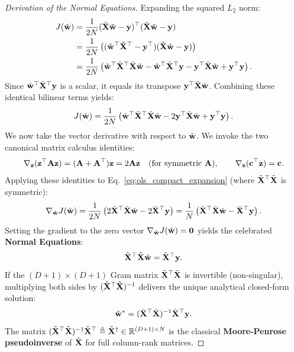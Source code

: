 \begin{proof}[Derivation of the Normal Equations]
Expanding the squared $L_2$ norm:
\begin{align}
J(\tilde{\mathbf{w}}) &= \frac{1}{2N} (\tilde{\mathbf{X}}\tilde{\mathbf{w}} - \mathbf{y})^\top (\tilde{\mathbf{X}}\tilde{\mathbf{w}} - \mathbf{y}) \nonumber \\
&= \frac{1}{2N} \left( (\tilde{\mathbf{w}}^\top \tilde{\mathbf{X}}^\top - \mathbf{y}^\top)(\tilde{\mathbf{X}}\tilde{\mathbf{w}} - \mathbf{y}) \right) \nonumber \\
&= \frac{1}{2N} \left( \tilde{\mathbf{w}}^\top \tilde{\mathbf{X}}^\top \tilde{\mathbf{X}} \tilde{\mathbf{w}} - \tilde{\mathbf{w}}^\top \tilde{\mathbf{X}}^\top \mathbf{y} - \mathbf{y}^\top \tilde{\mathbf{X}} \tilde{\mathbf{w}} + \mathbf{y}^\top \mathbf{y} \right).
\label{eq:ols_expansion}
\end{align}
Since $\tilde{\mathbf{w}}^\top \tilde{\mathbf{X}}^\top \mathbf{y}$ is a scalar, it equals its transpose $\mathbf{y}^\top \tilde{\mathbf{X}} \tilde{\mathbf{w}}$. Combining these identical bilinear terms yields:
\begin{equation}
J(\tilde{\mathbf{w}}) = \frac{1}{2N} \left( \tilde{\mathbf{w}}^\top \tilde{\mathbf{X}}^\top \tilde{\mathbf{X}} \tilde{\mathbf{w}} - 2 \mathbf{y}^\top \tilde{\mathbf{X}} \tilde{\mathbf{w}} + \mathbf{y}^\top \mathbf{y} \right).
\label{eq:ols_compact_expansion}
\end{equation}
We now take the vector derivative with respect to $\tilde{\mathbf{w}}$. We invoke the two canonical matrix calculus identities:
\begin{equation}
\nabla_{\mathbf{z}} (\mathbf{z}^\top \mathbf{A} \mathbf{z}) = (\mathbf{A} + \mathbf{A}^\top)\mathbf{z} = 2\mathbf{A}\mathbf{z} \quad (\text{for symmetric } \mathbf{A}), \qquad \nabla_{\mathbf{z}} (\mathbf{c}^\top \mathbf{z}) = \mathbf{c}.
\label{eq:matrix_calc_rules}
\end{equation}
Applying these identities to Eq.~\eqref{eq:ols_compact_expansion} (where $\tilde{\mathbf{X}}^\top \tilde{\mathbf{X}}$ is symmetric):
\begin{equation}
\nabla_{\tilde{\mathbf{w}}} J(\tilde{\mathbf{w}}) = \frac{1}{2N} \left( 2 \tilde{\mathbf{X}}^\top \tilde{\mathbf{X}} \tilde{\mathbf{w}} - 2 \tilde{\mathbf{X}}^\top \mathbf{y} \right) = \frac{1}{N} \left( \tilde{\mathbf{X}}^\top \tilde{\mathbf{X}} \tilde{\mathbf{w}} - \tilde{\mathbf{X}}^\top \mathbf{y} \right).
\label{eq:ols_gradient}
\end{equation}
Setting the gradient to the zero vector $\nabla_{\tilde{\mathbf{w}}} J(\tilde{\mathbf{w}}) = \mathbf{0}$ yields the celebrated \textbf{Normal Equations}:
\begin{equation}
\tilde{\mathbf{X}}^\top \tilde{\mathbf{X}} \tilde{\mathbf{w}} = \tilde{\mathbf{X}}^\top \mathbf{y}.
\label{eq:normal_equations}
\end{equation}
If the $(D+1) \times (D+1)$ Gram matrix $\tilde{\mathbf{X}}^\top \tilde{\mathbf{X}}$ is invertible (non-singular), multiplying both sides by $(\tilde{\mathbf{X}}^\top \tilde{\mathbf{X}})^{-1}$ delivers the unique analytical closed-form solution:
\begin{equation}
\tilde{\mathbf{w}}^* = (\tilde{\mathbf{X}}^\top \tilde{\mathbf{X}})^{-1} \tilde{\mathbf{X}}^\top \mathbf{y}.
\label{eq:ols_solution}
\end{equation}
The matrix $(\tilde{\mathbf{X}}^\top \tilde{\mathbf{X}})^{-1} \tilde{\mathbf{X}}^\top \triangleq \tilde{\mathbf{X}}^\dagger \in \mathbb{R}^{(D+1) \times N}$ is the classical \textbf{Moore-Penrose pseudoinverse} of $\tilde{\mathbf{X}}$ for full column-rank matrices.
\end{proof}


